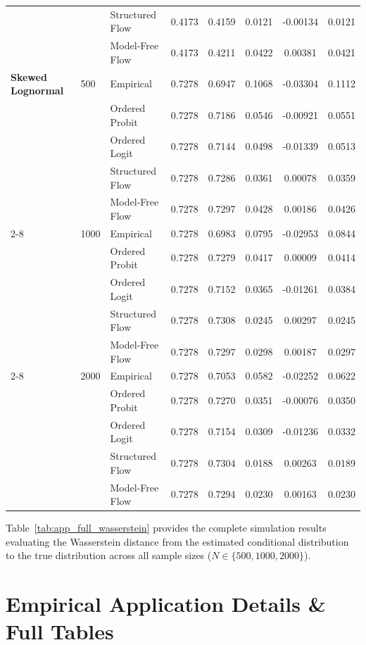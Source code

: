\documentclass{article}
\numberwithin{figure}{section}
\numberwithin{table}{section}
\numberwithin{equation}{section}
\begin{document}
\begin{table}[ht]
\begin{tabular}{lllccccc}
 &  & Structured Flow & 0.4173 & 0.4159 & 0.0121 & -0.00134 & 0.0121 \\
 &  & Model-Free Flow & 0.4173 & 0.4211 & 0.0422 & 0.00381 & 0.0421 \\
\midrule
\textbf{Skewed Lognormal} & 500 & Empirical & 0.7278 & 0.6947 & 0.1068 & -0.03304 & 0.1112 \\
 &  & Ordered Probit & 0.7278 & 0.7186 & 0.0546 & -0.00921 & 0.0551 \\
 &  & Ordered Logit & 0.7278 & 0.7144 & 0.0498 & -0.01339 & 0.0513 \\
 &  & Structured Flow & 0.7278 & 0.7286 & 0.0361 & 0.00078 & 0.0359 \\
 &  & Model-Free Flow & 0.7278 & 0.7297 & 0.0428 & 0.00186 & 0.0426 \\
\cline{2-8}
 & 1000 & Empirical & 0.7278 & 0.6983 & 0.0795 & -0.02953 & 0.0844 \\
 &  & Ordered Probit & 0.7278 & 0.7279 & 0.0417 & 0.00009 & 0.0414 \\
 &  & Ordered Logit & 0.7278 & 0.7152 & 0.0365 & -0.01261 & 0.0384 \\
 &  & Structured Flow & 0.7278 & 0.7308 & 0.0245 & 0.00297 & 0.0245 \\
 &  & Model-Free Flow & 0.7278 & 0.7297 & 0.0298 & 0.00187 & 0.0297 \\
\cline{2-8}
 & 2000 & Empirical & 0.7278 & 0.7053 & 0.0582 & -0.02252 & 0.0622 \\
 &  & Ordered Probit & 0.7278 & 0.7270 & 0.0351 & -0.00076 & 0.0350 \\
 &  & Ordered Logit & 0.7278 & 0.7154 & 0.0309 & -0.01236 & 0.0332 \\
 &  & Structured Flow & 0.7278 & 0.7304 & 0.0188 & 0.00263 & 0.0189 \\
 &  & Model-Free Flow & 0.7278 & 0.7294 & 0.0230 & 0.00163 & 0.0230 \\
\bottomrule
\end{tabular}
\end{table}

Table~\ref{tab:app_full_wasserstein} provides the complete simulation results evaluating the Wasserstein distance from the estimated conditional distribution to the true distribution across all sample sizes ($N \in \{500, 1000, 2000\}$).


\clearpage

\section{Empirical Application Details \& Full Tables}
\label{app:empirical}
\end{document}
